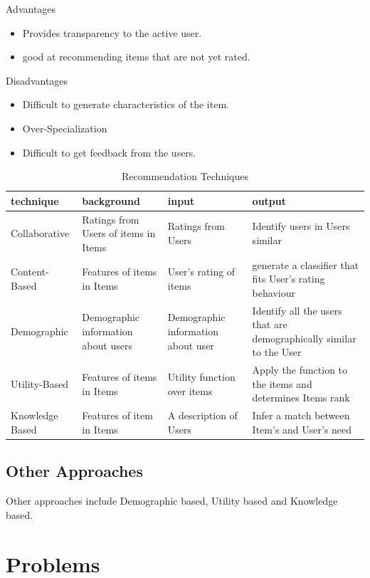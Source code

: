 \documentclass[conference]{IEEEtran}
\begin{document}
	Advantages	
	\begin{itemize}
	\item Provides transparency to the active user.
	\item good at recommending items that are not yet rated.
	\end{itemize}
	Disadvantages	
	\begin{itemize}
	\item Difficult to generate characteristics of the item. 
	\item Over-Specialization
	\item Difficult to get feedback from the users.
	\end{itemize}	
	
	\begin{table}[h]
	
\begin{tabular}{|p{1.5cm}|p{1.5cm}|p{2cm}|p{2cm}|}
\hline
\textbf{technique} & \textbf{background} & \textbf{input} & \textbf{output} \\ \hline
Collaborative & Ratings from Users of items in Items & Ratings from Users & Identify users in Users similar \\ \hline
Content-Based & Features of items in Items & User's rating of items & generate a classifier that fits User's rating behaviour \\ \hline
Demographic & Demographic information about users & Demographic information about user & Identify all the users that are demographically similar to the User \\ \hline
Utility-Based & Features of items in Items & Utility function over items & Apply the function to the items and determines Items rank \\ \hline
Knowledge Based & Features of item in Items & A description of Users & Infer a match between Item's and User's need \\ \hline
\end{tabular}
\caption{Recommendation Techniques}
\label{Table1}
\end{table}
\subsection{Other Approaches}

	Other approaches include Demographic based, Utility based and Knowledge based.
	

\section{Problems}
\end{document}
